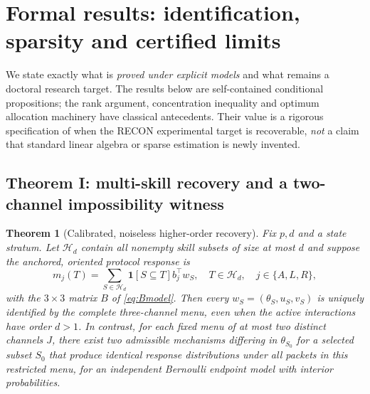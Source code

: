 \documentclass[11pt,a4paper]{article}
\newcommand{\Hh}{\mathcal{H}}\newcommand{\V}{\mathcal{V}}
\newcommand{\ind}{\mathbf{1}}\newcommand{\supp}{\mathrm{supp}}
\newtheorem{theorem}{Theorem}[section]
\theoremstyle{definition}\newtheorem{definition}[theorem]{Definition}
\theoremstyle{remark}\newtheorem{remark}[theorem]{Remark}
\begin{document}
\section{Formal results: identification, sparsity and certified limits}\label{sec:theory}
We state exactly what is \emph{proved under explicit models} and what remains a doctoral research target. The results below are self-contained conditional propositions; the rank argument, concentration inequality and optimum allocation machinery have classical antecedents. Their value is a rigorous specification of when the RECON experimental target is recoverable, \emph{not} a claim that standard linear algebra or sparse estimation is newly invented.

\subsection{Theorem I: multi-skill recovery and a two-channel impossibility witness}
\begin{theorem}[Calibrated, noiseless higher-order recovery]\label{thm:kronecker}
Fix $p,d$ and a state stratum. Let $\Hh_d$ contain all nonempty skill subsets of size at most $d$ and suppose the anchored, oriented protocol response is
\[
 m_j(T)=\sum_{S\in\Hh_d}\ind[S\subseteq T]b_j^\top w_S,
 \quad T\in \Hh_d,\quad j\in\{A,L,R\},
\]
with the $3\times3$ matrix $B$ of \cref{eq:Bmodel}. Then \emph{every} $w_S=(\theta_S,u_S,v_S)$ is uniquely identified by the complete three-channel menu, even when the active interactions have order $d>1$. In contrast, for \emph{each fixed} menu of at most two distinct channels $J$, there exist two admissible mechanisms differing in $\theta_{S_0}$ for a selected subset $S_0$ that produce \emph{identical response distributions} under all packets in this restricted menu, for an independent Bernoulli endpoint model with interior probabilities.
\end{theorem}
\end{document}

